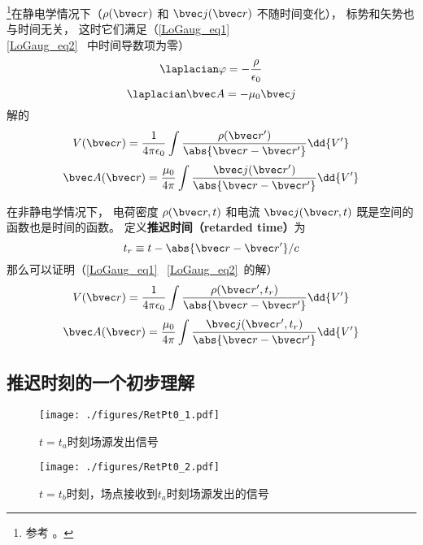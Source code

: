 

\footnote{参考 \cite{GriffE}。}在静电学情况下（$\rho(\bvec r)$ 和 $\bvec j(\bvec r)$ 不随时间变化）， 标势和矢势也与时间无关， 这时它们满足（\autoref{LoGaug_eq1}~ \autoref{LoGaug_eq2}~ 中时间导数项为零）
\begin{equation}
\laplacian \varphi = -\frac{\rho}{\epsilon_0}
\end{equation}
\begin{equation}
\laplacian \bvec A = -\mu_0 \bvec j
\end{equation}
解的
\begin{equation}
V(\bvec r) = \frac{1}{4\pi\epsilon_0} \int \frac{\rho(\bvec r')}{\abs{\bvec r - \bvec r'}} \dd{V'}
\end{equation}
\begin{equation}
\bvec A(\bvec r) = \frac{\mu_0}{4\pi} \int \frac{\bvec j(\bvec r')}{\abs{\bvec r - \bvec r'}} \dd{V'}
\end{equation}

在非静电学情况下， 电荷密度 $\rho(\bvec r, t)$ 和电流 $\bvec j(\bvec r, t)$ 既是空间的函数也是时间的函数。 定义\textbf{推迟时间（retarded time）}为
\begin{equation}
t_r \equiv t - \abs{\bvec r - \bvec r'}/c
\end{equation}
那么可以证明（\autoref{LoGaug_eq1}~ \autoref{LoGaug_eq2}~的解）
\begin{equation}
V(\bvec r) = \frac{1}{4\pi\epsilon_0} \int \frac{\rho(\bvec r', t_r)}{\abs{\bvec r - \bvec r'}} \dd{V'}
\end{equation}
\begin{equation}
\bvec A(\bvec r) = \frac{\mu_0}{4\pi} \int \frac{\bvec j(\bvec r', t_r)}{\abs{\bvec r - \bvec r'}} \dd{V'}
\end{equation}

\subsection{推迟时刻的一个初步理解}
\begin{figure}[ht]
\centering
\texttt{[image: ./figures/RetPt0\_1.pdf]}
\caption{$t=t_a$时刻场源发出信号} \label{RetPt0_fig1}
\end{figure}
\begin{figure}[ht]
\centering
\texttt{[image: ./figures/RetPt0\_2.pdf]}
\caption{$t=t_b$时刻，场点接收到$t_a$时刻场源发出的信号} \label{RetPt0_fig2}
\end{figure}


